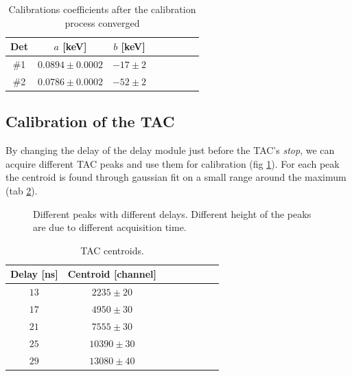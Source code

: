 \documentclass[11pt,a4 paper]{article}
\begin{document}
\begin{table}
  \centering
  \begin{tabular}{cccccccc}
    \toprule
    Det & $a$ [keV] & $b$ [keV] \\
    \midrule
    \#1 & $0.0894 \pm 0.0002$ & $-17 \pm 2$ \\
    \#2 & $0.0786 \pm 0.0002$ & $-52 \pm 2$ \\
    \bottomrule
  \end{tabular}
  \caption{Calibrations coefficients after the calibration process converged}
  \label{tab:calibr:coeffs}
\end{table}

\subsection{Calibration of the TAC}

By changing the delay of the delay module just before the TAC's \emph{stop}, we can acquire different TAC peaks and use them for calibration (fig \ref{fig:tac:calibr}).
For each peak the centroid is found through gaussian fit on a small range around the maximum (tab \ref{tab:tac:calibr}).

\begin{figure}
    \centering
    \caption{Different peaks with different delays. Different height of the peaks are due to different acquisition time.}
    \label{fig:tac:calibr}
\end{figure}

\begin{table}
    \centering
    \begin{tabular}{cccccccc}
        \toprule
        Delay [ns] & Centroid [channel] \\
        \midrule
        $13$ & $2235\pm 20$ \\
        $17$ & $4950\pm 30$ \\
        $21$ & $7555\pm 30$ \\
        $25$ & $10390\pm 30$ \\
        $29$ & $13080\pm 40$ \\
        \bottomrule
    \end{tabular}
    \caption{TAC centroids.}
    \label{tab:tac:calibr}
\end{table}
\end{document}
